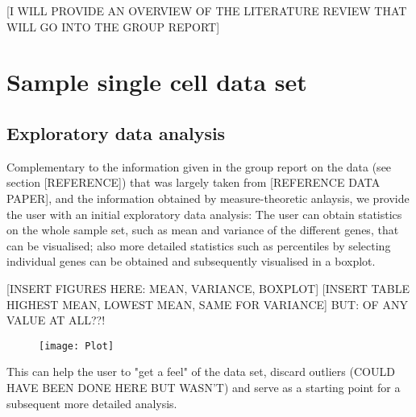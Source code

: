 \documentclass[journal, a4paper]{IEEEtran}
\begin{document}
[I WILL PROVIDE AN OVERVIEW OF THE LITERATURE REVIEW THAT WILL GO INTO THE GROUP REPORT]



\section{Sample single cell data set}


\subsection{Exploratory data analysis}

Complementary to the information given in the group report on the data (see section [REFERENCE]) that was largely taken from [REFERENCE DATA PAPER], and the information obtained by measure-theoretic anlaysis, we provide the user with an initial exploratory data analysis:
The user can obtain statistics on the whole sample set, such as mean and variance of the different genes, that can be visualised; also more detailed statistics such as percentiles by selecting individual genes can be obtained and subsequently visualised in a boxplot. 

[INSERT FIGURES HERE: MEAN, VARIANCE, BOXPLOT] 
[INSERT TABLE HIGHEST MEAN, LOWEST MEAN, SAME FOR VARIANCE]
BUT: OF ANY VALUE AT ALL??!

\begin{figure}[t]
	\texttt{[image: Plot]}
	\centering
\end{figure}

This can help the user to "get a feel" of the data set, discard outliers (COULD HAVE BEEN DONE HERE BUT WASN'T) and serve as a starting point for a subsequent more detailed analysis. 


\end{document}
